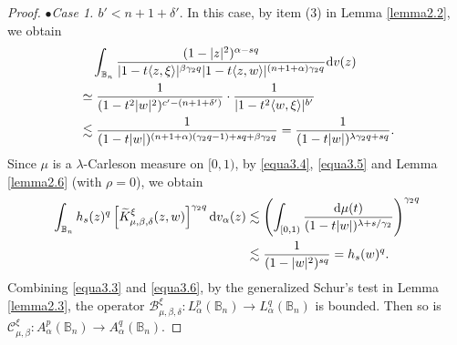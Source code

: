 \documentclass[preprint,12pt,times]{elsarticle}
\theoremstyle{definition}
\theoremstyle{remark}
\numberwithin{equation}{section}
\begin{document}
\begin{proof}
$\bullet${\it Case 1. $b'<n+1+\delta'$}. In this case, by item (3) in Lemma \ref{lemma2.2}, we obtain
\begin{equation}\label{equa3.5}
\begin{split}
&\quad \int_{\mathbb{B}_n}\frac{(1-|z|^2)^{\alpha-sq}}{|1-t\langle z,\xi\rangle|^{\beta\gamma_2 q}|1-t\langle z,w\rangle|^{(n+1+\alpha)\gamma_2 q}}{\rm d}v(z)\\
&\simeq \frac{1}{(1-t^2|w|^2)^{c'-(n+1+\delta')}}\cdot\frac{1}{|1-t^2\langle w,\xi\rangle|^{b'}}\\
&\lesssim \frac{1}{(1-t|w|)^{(n+1+\alpha)(\gamma_2 q-1)+sq+\beta\gamma_2 q}}=\frac{1}{(1-t|w|)^{\lambda\gamma_2 q+sq}}.
\end{split}
\end{equation}
Since $\mu$ is a $\lambda$-Carleson measure on $[0,1)$, by \eqref{equa3.4}, \eqref{equa3.5} and Lemma \ref{lemma2.6} (with $\rho=0$), we obtain
\begin{equation}\label{equa3.6}
\begin{split}
\int_{\mathbb{B}_n}h_s(z)^q\left[\widetilde{K}_{\mu,\beta,\delta}^{\xi}(z,w)\right]^{\gamma_2q}{\rm d}v_{\alpha}(z)&\lesssim \left(\int_{[0,1)}\frac{{\rm d}\mu(t)}{(1-t|w|)^{\lambda+s/\gamma_2}}\right)^{\gamma_2 q}\\
&\lesssim \frac{1}{(1-|w|^2)^{sq}}=h_s(w)^q.
\end{split}
\end{equation}
Combining \eqref{equa3.3} and \eqref{equa3.6}, by the generalized Schur's test in Lemma \ref{lemma2.3}, the operator $\mathcal{B}_{\mu,\beta,\delta}^{\xi}: L_{\alpha}^p(\mathbb{B}_n)\to L_{\alpha}^q(\mathbb{B}_n)$ is bounded. Then so is $\mathcal{C}_{\mu,\beta}^{\xi}: A_{\alpha}^p(\mathbb{B}_n)\to A_{\alpha}^q(\mathbb{B}_n)$.


\end{proof}
\end{document}
